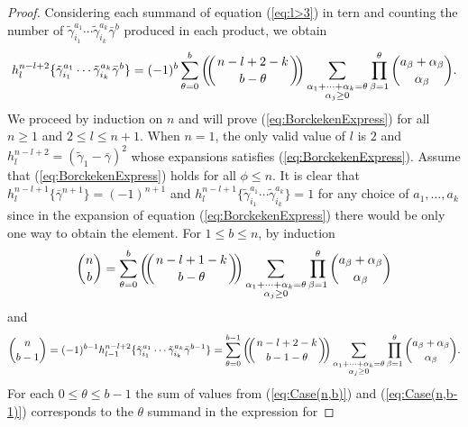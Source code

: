 \documentclass{article}
\theoremstyle{plain}
\theoremstyle{definition}
\numberwithin{thm}{section}
\begin{document}
\begin{proof}
				Considering each summand of equation (\ref{eq:l>3}) in tern and counting the number of 
				$\tilde{\gamma}_{i_1}^{a_1}\cdots\tilde{\gamma}_{i_k}^{a_k}\bar{\gamma}^{b}$
				produced in each product, we obtain
				\begin{equation*}
					h^{n-l+2}_l\{ \tilde{\gamma}_{i_1}^{a_1}\cdots\tilde{\gamma}_{i_k}^{a_k}\bar{\gamma}^{b} \} =
					(-1)^b
					\sum_{\theta=0}^{b}{{\ensuremath{\left(\kern-.3em\left(\genfrac{}{}{0pt}{}{{n-l+2-k}}{{b-\theta}}\right)\kern-.3em\right)}}\sum_{\substack{\alpha_1+\cdots+\alpha_k=\theta \\ \alpha_j\geq 0}}
					{\prod^{\theta}_{\beta=1}{\binom{a_\beta+\alpha_\beta}{\alpha_\beta}}}}.
				\end{equation*}
				We proceed by induction on $n$ and will prove (\ref{eq:BorckekenExpress}) for all $n\geq 1$ and $2\leq l\leq n+1$.
				When $n=1$, the only valid value of $l$ is $2$ and $h^{n-l+2}_{l}=(\tilde{\gamma}_1-\bar{\gamma})^2$ whose expansions satisfies (\ref{eq:BorckekenExpress}). 
				Assume that (\ref{eq:BorckekenExpress}) holds for all $\phi\leq n$.
				It is clear that $h^{n-l+1}_{l}\{ \bar{\gamma}^{n+1} \}=(-1)^{n+1}$ and $h^{n-l+1}_{l}\{ \tilde{\gamma}_{i_1}^{a_1}\cdots\tilde{\gamma}_{i_k}^{a_k} \}=1$
				for any choice of $a_1,\dots,a_{k}$ since in the expansion of equation (\ref{eq:BorckekenExpress}) there would be only one way to obtain the element.
				For $1\leq b \leq n$, by induction
				\begin{equation}\label{eq:Case(n,b)}
					\binom{n}{b}
					=\sum_{\theta=0}^{b}{{\ensuremath{\left(\kern-.3em\left(\genfrac{}{}{0pt}{}{{n-l+1-k}}{{b-\theta}}\right)\kern-.3em\right)}}\sum_{\substack{\alpha_1+\cdots+\alpha_k=\theta \\ \alpha_j\geq 0}}
					 {\prod^{\theta}_{\beta=1}{\binom{a_\beta+\alpha_\beta}{\alpha_\beta}}}}
				\end{equation}
				and
				\begin{equation}\label{eq:Case(n,b-1)}
					\binom{n}{b-1}=(-1)^{b-1}h^{n-l+2}_{l-1}\{ \tilde{\gamma}_{i_1}^{a_1}\cdots\tilde{\gamma}_{i_k}^{a_k}\bar{\gamma}^{b-1} \}
					=\sum_{\theta=0}^{b-1}{{\ensuremath{\left(\kern-.3em\left(\genfrac{}{}{0pt}{}{{n-l+2-k}}{{b-1-\theta}}\right)\kern-.3em\right)}}\sum_{\substack{\alpha_1+\cdots+\alpha_k=\theta \\ \alpha_j\geq 0}}
					 {\prod^{\theta}_{\beta=1}{\binom{a_\beta+\alpha_\beta}{\alpha_\beta}}}}.
				\end{equation}
				For each $0\leq\theta\leq b-1$ the sum of values from (\ref{eq:Case(n,b)}) and (\ref{eq:Case(n,b-1)}) corresponds to the $\theta$ summand in the expression for  

\end{proof}
\end{document}
